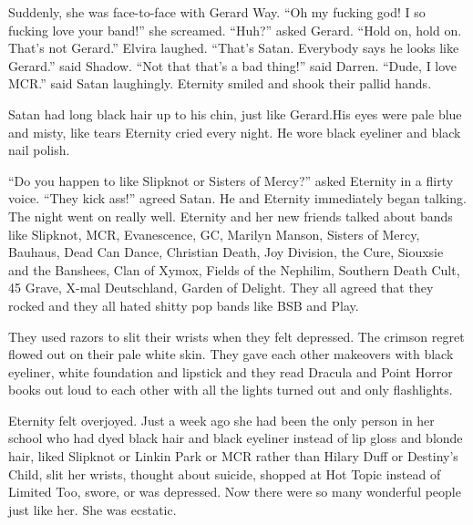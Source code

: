 Suddenly, she was face-to-face with Gerard Way. \enquote{Oh my fucking god! I so fucking love your band!} she screamed. \enquote{Huh?} asked Gerard. \enquote{Hold on, hold on. That's not Gerard.} Elvira laughed. \enquote{That's Satan. Everybody says he looks like Gerard.} said Shadow. \enquote{Not that that's a bad thing!} said Darren. \enquote{Dude, I love MCR.} said Satan laughingly. Eternity smiled and shook their pallid hands.

Satan had long black hair up to his chin, just like Gerard.His eyes were pale blue and misty, like tears Eternity cried every night. He wore black eyeliner and black nail polish.

\begin{sloppypar}
    \enquote{Do you happen to like Slipknot or Sisters of Mercy?} asked Eternity in a flirty voice. \enquote{They kick ass!} agreed Satan. He and Eternity immediately began talking. The night went on really well. Eternity and her new friends talked about bands like Slipknot, MCR, Evanescence, GC, Marilyn Manson, Sisters of Mercy, Bauhaus, Dead Can Dance, Christian Death, Joy Division, the Cure, Siouxsie and the Banshees, Clan of Xymox, Fields of the Nephilim, Southern Death Cult, 45 Grave, X-mal Deutschland, Garden of Delight. They all agreed that they rocked and they all hated shitty pop bands like BSB and Play.
\end{sloppypar}

They used razors to slit their wrists when they felt depressed. The crimson regret flowed out on their pale white skin. They gave each other makeovers with black eyeliner, white foundation and lipstick and they read Dracula and Point Horror books out loud to each other with all the lights turned out and only flashlights.

Eternity felt overjoyed. Just a week ago she had been the only person in her school who had dyed black hair and black eyeliner instead of lip gloss and blonde hair, liked Slipknot or Linkin Park or MCR rather than Hilary Duff or Destiny's Child, slit her wrists, thought about suicide, shopped at Hot Topic instead of Limited Too, swore, or was depressed. Now there were so many wonderful people just like her. She was ecstatic.
